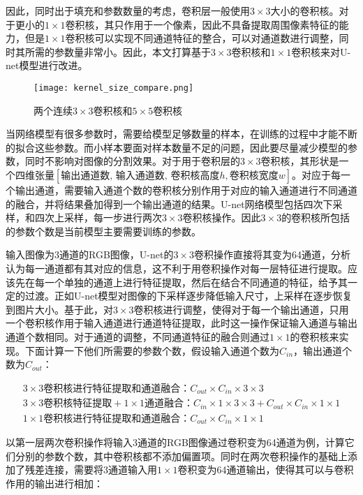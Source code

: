 \documentclass[AutoFakeBold]{LZUThesis}
\begin{document}
因此，同时出于填充和参数数量的考虑，卷积层一般使用$3\times 3$大小的卷积核。对于更小的$1\times 1$卷积核，其只作用于一个像素，因此不具备提取周围像素特征的能力，但是$1 \times 1$卷积核可以实现不同通道特征的整合，可以对通道数进行调整，同时其所需的参数量非常小。因此，本文打算基于$3\times 3$卷积核和$1\times 1$卷积核来对U-net模型进行改进。
\begin{figure*}[htbp]
    \centering
    \texttt{[image: kernel\_size\_compare.png]}
    \caption{两个连续$3\times 3$卷积核和$5\times 5$卷积核}
    \label{kernel_size_compare}
\end{figure*}
当网络模型有很多参数时，需要给模型足够数量的样本，在训练的过程中才能不断的拟合这些参数。而小样本要面对样本数量不足的问题，因此要尽量减少模型的参数，同时不影响对图像的分割效果。对于用于卷积层的$3\times 3$卷积核，其形状是一个四维张量$[\mbox{输出通道数, 输入通道数, 卷积核高度}h, \mbox{卷积核宽度}w]$。对应于每一个输出通道，需要输入通道个数的卷积核分别作用于对应的输入通道进行不同通道的融合，并将结果叠加得到一个输出通道的结果。U-net网络模型包括四次下采样，和四次上采样，每一步进行两次$3\times3$卷积核操作。因此$3\times 3$的卷积核所包括的参数个数是当前模型主要需要训练的参数。

输入图像为3通道的RGB图像，U-net的$3\times 3$卷积操作直接将其变为64通道，分析认为每一通道都有其对应的信息，这不利于用卷积操作对每一层特征进行提取。应该先在每一个单独的通道上进行特征提取，然后在结合不同通道的特征，给予其一定的过渡。正如U-net模型对图像的下采样逐步降低输入尺寸，上采样在逐步恢复到图片大小。基于此，对$3\times 3$卷积核进行调整，使得对于每一个输出通道，只用一个卷积核作用于输入通道进行通道特征提取，此时这一操作保证输入通道与输出通道个数相同。对于通道的调整，不同通道特征的融合则通过$1\times 1$的卷积核来实现。下面计算一下他们所需要的参数个数，假设输入通道个数为$C_{in}$，输出通道个数为$C_{out}$：


\begin{equation}
    \begin{split}
        3\times3\mbox{卷积核进行特征提取和通道融合：}C_{out}\times C_{in}\times 3\times 3 \\
        3\times 3\mbox{卷积核特征提取}+ 1\times 1\mbox{通道融合：}C_{in} \times 1 \times 3 \times 3+ C_{out} \times C_{in} \times 1 \times 1\\
        1\times 1\mbox{卷积核进行特征提取和通道融合：}C_{out}\times C_{in}\times 1\times 1
    \end{split}
\end{equation}
\par
以第一层两次卷积操作将输入3通道的RGB图像通过卷积变为64通道为例，计算它们分别的参数个数，其中卷积核都不添加偏置项。同时在两次卷积操作的基础上添加了残差连接，需要将3通道输入用$1\times 1$卷积变为64通道输出，使得其可以与卷积作用的输出进行相加：
\end{document}
